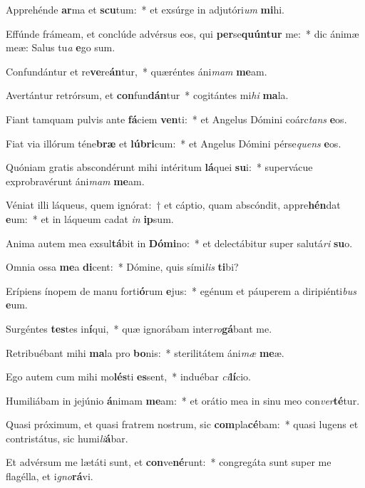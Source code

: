 \item Apprehénde \textbf{ar}ma et \textbf{scu}tum:~* et exsúrge in adjutóri\textit{um} \textbf{mi}hi.
\item Effúnde frámeam, et conclúde advérsus eos, qui \textbf{per}se\textbf{quún}\textbf{tur} me:~* dic ánimæ meæ: Salus tu\textit{a} \textbf{e}go sum.
\item Confundántur et re\textbf{ve}re\textbf{án}tur,~* quæréntes áni\textit{mam} \textbf{me}am.
\item Avertántur retrórsum, et \textbf{con}fun\textbf{dán}tur~* cogitántes mi\textit{hi} \textbf{ma}la.
\item Fiant tamquam pulvis ante \textbf{fá}ciem \textbf{ven}ti:~* et Angelus Dómini coárc\textit{tans} \textbf{e}os.
\item Fiat via illórum téne\textbf{bræ} et \textbf{lú}\textbf{bri}cum:~* et Angelus Dómini pérse\textit{quens} \textbf{e}os.
\item Quóniam gratis abscondérunt mihi intéritum \textbf{lá}quei \textbf{su}i:~* supervácue exprobravérunt áni\textit{mam} \textbf{me}am.
\item Véniat illi láqueus, quem ignórat:~† et cáptio, quam abscóndit, appre\textbf{hén}dat \textbf{e}um:~* et in láqueum cadat \textit{in} \textbf{ip}sum.
\item Anima autem mea exsul\textbf{tá}bit in \textbf{Dó}\textbf{mi}no:~* et delectábitur super salutá\textit{ri} \textbf{su}o.
\item Omnia ossa \textbf{me}a \textbf{di}cent:~* Dómine, quis sími\textit{lis} \textbf{ti}bi?
\item Erípiens ínopem de manu forti\textbf{ó}rum \textbf{e}jus:~* egénum et páuperem a diripiénti\textit{bus} \textbf{e}um.
\item Surgéntes \textbf{tes}tes in\textbf{í}qui,~* quæ ignorábam inter\textit{ro}\textbf{gá}bant me.
\item Retribuébant mihi \textbf{ma}la pro \textbf{bo}nis:~* sterilitátem áni\textit{mæ} \textbf{me}æ.
\item Ego autem cum mihi mo\textbf{lés}ti \textbf{es}sent,~* induébar \textit{ci}\textbf{lí}cio.
\item Humiliábam in jejúnio \textbf{á}nimam \textbf{me}am:~* et orátio mea in sinu meo con\textit{ver}\textbf{té}tur.
\item Quasi próximum, et quasi fratrem nostrum, sic \textbf{com}pla\textbf{cé}bam:~* quasi lugens et contristátus, sic humi\textit{li}\textbf{á}bar.
\item Et advérsum me lætáti sunt, et \textbf{con}ve\textbf{né}runt:~* congregáta sunt super me flagélla, et i\textit{gno}\textbf{rá}vi.
